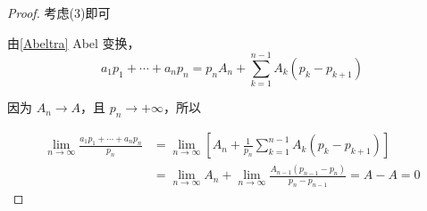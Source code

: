 \begin{proof}
	考虑(3)即可
	
	由\ref{Abeltra} Abel 变换，
	\[
	a_1 p_1 + \cdots + a_n p_n = p_n A_n + \sum_{k=1}^{n-1} A_k (p_k - p_{k+1})
	\]
	
	因为 $A_n \to A$，且 $p_n \to +\infty$，所以
	
	$$\begin{aligned}
		\lim_{n \to \infty} \frac{a_1 p_1 + \cdots + a_n p_n}{p_n}& = 	\lim_{n \to \infty}\left[A_n + \frac{1}{p_n} \sum_{k=1}^{n-1} A_k (p_k - p_{k+1})\right]\\&=\lim\limits_{n\to \infty}A_n+\lim\limits_{n\to \infty}\frac{A_{n-1}(p_{n-1}-p_{n})}{p_{n}-p_{n-1}}=A-A = 0
	\end{aligned}$$
	
	
	
\end{proof}

